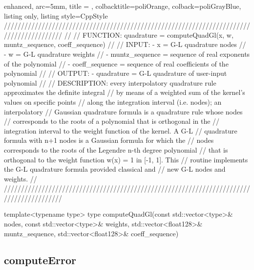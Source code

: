\documentclass[a4paper, twosided]{book}
\begin{document}
\begin{tcblisting}{enhanced,
                   arc=5mm,
                   title = \color{black}{\large \ttfamily MonMap.cpp/computeQuadGl},
                   colbacktitle=poliOrange,
                   colback=poliGrayBlue,
                   listing only,
                   listing style=CppStyle}
/////////////////////////////////////////////////////////////////////////////////////////
//
//       FUNCTION: quadrature = computeQuadGl(x, w, muntz_sequence, coeff_sequence)
//                
//          INPUT: - x = G-L quadrature nodes
//                 - w = G-L quadrature weights
//                 - muntz_sequence = sequence of real exponents of the polynomial
//                 - coeff_sequence = sequence of real coefficients of the polynomial
//
//         OUTPUT: - quadrature = G-L quadrature of user-input polynomial
//
//    DESCRIPTION: every interpolatory quadrature rule approximates the definite integral
//                 by means of a weighted sum of the kernel's values on specific points
//                 along the integration interval (i.e. nodes); an interpolatory
//                 Gaussian quadrature formula is a quadrature rule whose nodes 
//                 corresponds to the roots of a polynomial that is orthogonal in the 
//                 integration interval to the weight function of the kernel. A G-L 
//                 quadrature formula with n+1 nodes is a Gaussian formula for which the
//                 nodes corresponds to the roots of the Legendre n-th degree polynomial
//                 that is orthogonal to the weight function w(x) = 1 in [-1, 1]. This 
//                 routine implements the G-L quadrature formula provided classical and
//                 new G-L nodes and weights.
//
/////////////////////////////////////////////////////////////////////////////////////////

template<typename type>
type computeQuadGl(const std::vector<type>& nodes, const std::vector<type>& weights, std::vector<float128>& muntz_sequence, std::vector<float128>& coeff_sequence)
\end{tcblisting}

\subsection[computeError]{\changefont computeError}\label{SubSec4.1.7}
\end{document}
